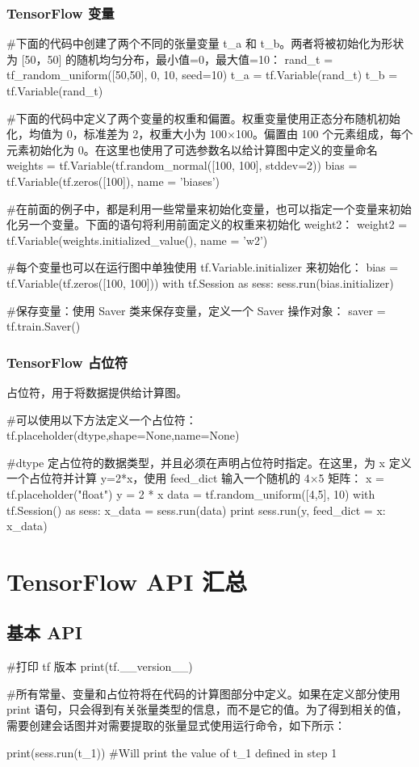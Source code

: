 \documentclass[12pt]{article}
\begin{document}
\subsubsection{TensorFlow 变量}
\begin{python}
#下面的代码中创建了两个不同的张量变量 t_a 和 t_b。两者将被初始化为形状为 [50，50] 的随机均匀分布，最小值=0，最大值=10：
rand_t = tf_random_uniform([50,50], 0, 10, seed=10)
t_a = tf.Variable(rand_t)
t_b = tf.Variable(rand_t)

#下面的代码中定义了两个变量的权重和偏置。权重变量使用正态分布随机初始化，均值为 0，标准差为 2，权重大小为 100×100。偏置由 100 个元素组成，每个元素初始化为 0。在这里也使用了可选参数名以给计算图中定义的变量命名
weights = tf.Variable(tf.random_normal([100, 100], stddev=2))
bias = tf.Variable(tf.zeros([100]), name = 'biases')

#在前面的例子中，都是利用一些常量来初始化变量，也可以指定一个变量来初始化另一个变量。下面的语句将利用前面定义的权重来初始化 weight2：
weight2 = tf.Variable(weights.initialized_value(), name = 'w2')

#每个变量也可以在运行图中单独使用 tf.Variable.initializer 来初始化：
bias = tf.Variable(tf.zeros([100, 100]))
with tf.Session as sess:
	sess.run(bias.initializer)
	
#保存变量：使用 Saver 类来保存变量，定义一个 Saver 操作对象：
saver = tf.train.Saver()
\end{python}

\subsubsection{TensorFlow 占位符}
占位符，用于将数据提供给计算图。
\begin{python}
#可以使用以下方法定义一个占位符：
tf.placeholder(dtype,shape=None,name=None)

#dtype 定占位符的数据类型，并且必须在声明占位符时指定。在这里，为 x 定义一个占位符并计算 y=2*x，使用 feed_dict 输入一个随机的 4×5 矩阵：
x = tf.placeholder("float")
y = 2 * x
data = tf.random_uniform([4,5], 10)
with tf.Session() as sess:
	x_data = sess.run(data)
	print sess.run(y, feed_dict = {x: x_data})
\end{python}

\section{TensorFlow API 汇总}
\subsection{基本 API}
\begin{python}
#打印 tf 版本
print(tf.__version__) 

#所有常量、变量和占位符将在代码的计算图部分中定义。如果在定义部分使用 print 语句，只会得到有关张量类型的信息，而不是它的值。为了得到相关的值，需要创建会话图并对需要提取的张量显式使用运行命令，如下所示：

print(sess.run(t_1)) #Will print the value of t_1 defined in step 1
\end{python}
\end{document}
